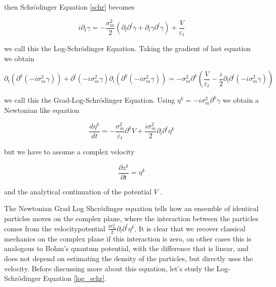\documentclass[a4paper,12pt]{article}
\begin{document}
then Schr\"odinger Equation \ref{schr} becomes

\begin{equation}\label{log_schr}
i \partial_t \gamma = - \frac{\sigma_m^2}{2} (\partial_l \partial^l \gamma + \partial_l \gamma \partial^l \gamma) + \frac{V}{\varepsilon_t}
\end{equation}

we call this the Log-Schr\"odinger Equation. Taking the gradient of last equation we obtain



\begin{equation}\label{grad_log_schr}
\partial_t \left( \partial^k (-i \sigma_m^2  \gamma)  \right) + \partial^l (-i \sigma_m^2 \gamma )  \partial_l(  \partial^k (-i \sigma_m^2 \gamma) )  = -  \sigma_m^2 \partial^k \left( \frac{V}{\varepsilon_t} - \frac{i}{2} \partial_l \partial^l (-i \sigma_m^2 \gamma) \right)
\end{equation}

we call this the Grad-Log-Schr\"odinger Equation. Using $ \eta^k = -i \sigma_m^2  \partial^k\gamma $ we obtain  a Newtonian like equation

\begin{equation}\label{newton_complex}
\frac{d \eta^k}{dt} = -  \frac{\sigma_m^2}{ \varepsilon_t} \partial^k  V + \frac{i\sigma_m^2}{2 } \partial_l \partial^l \eta^k
\end{equation}

but we have to assume a complex velocity 

\begin{equation}\label{velocity_complex}
 \frac{\partial z^k}{\partial t} = \eta^k
\end{equation}

and the analytical continuation of the potential $V$ \cite{yordanov2024complex}. 

The Newtonian Grad Log Shcr\"odinger equation tells how an ensemble of identical particles moves on the complex plane, where 
the interaction between the particles comes from the velocitypotential $ \frac{i\sigma_m^2}{2 } \partial_l \partial^l \eta^k$. It is clear
that we recover classical mechanics on the complex plane if this interaction is zero, on other cases this is analogous to Bohm's
quantum potential, with the difference that is linear, and does not depend on estimating the density of the particles, but directly uses
the velocity. Before discussing more about this equation, let's study the Log-Schr\"odinger Equation \ref{log_schr}.
\end{document}
